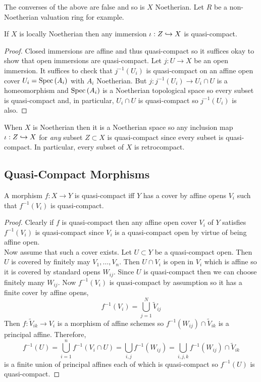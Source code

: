 \documentclass[12pt]{article}
\begin{document}
\begin{rmk}
The converses of the above are false and so is $X$ Noetherian. Let $R$ be a non-Noetherian valuation ring for example.
\end{rmk}

\begin{lemma}
If $X$ is locally Noetherian then any immersion $\iota : Z \hookrightarrow X$ is quasi-compact.
\end{lemma}

\begin{proof}
Closed immersions are affine and thus quasi-compact so it suffices okay to show that open immersions are quasi-compact. Let $j : U \to X$ be an open immersion. It suffices to check that $j^{-1}(U_i)$ is quasi-compact on an affine open cover $U_i = \mathrm{Spec}\left( A_i \right)$ with $A_i$ Noetherian. But $j : j^{-1}(U_i) \to U_i \cap U$ is a homeomorphism and $\mathrm{Spec}\left( A_i \right)$ is a Noetherian topological space so every subset is quasi-compact and, in particular, $U_i \cap U$ is quasi-compact so $j^{-1}(U_i)$ is also.
\end{proof}

\begin{rmk}
When $X$ is Noetherian then it is a Noetherian space so any inclusion map $\iota : Z \hookrightarrow X$ for \textit{any} subset $Z \subset X$ is quasi-compact since every subset is quasi-compact. In particular, every subset of $X$ is retrocompact. 
\end{rmk}

\subsection{Quasi-Compact Morphisms}

\begin{lemma}
A morphism $f : X \to Y$ is quasi-compact iff $Y$ has a cover by affine opens $V_i$ such that $f^{-1}(V_i)$ is quasi-compact.
\end{lemma}

\begin{proof}
Clearly if $f$ is quasi-compact then any affine open cover $V_i$ of $Y$ satisfies $f^{-1}(V_i)$ is quasi-compact since $V_i$ is a quasi-compact open by virtue of being affine open.
\bigskip\\
Now assume that such a cover exists. Let $U \subset Y$ be a quasi-compact open. Then $U$ is covered by finitely may $V_1, \dots, V_n$. Then $U \cap V_i$ is open in $V_i$ which is affine so it is covered by standard opens $W_{ij}$. Since $U$ is quasi-compact then we can choose finitely many $W_{ij}$. Now $f^{-1}(V_i)$ is quasi-compact by assumption so it has a finite cover by affine opens,
\[ f^{-1}(V_i) = \bigcup_{j = 1}^N \tilde{V}_{ij} \]
Then $f : \tilde{V}_{ik} \to V_i$ is a morphism of affine schemes so $f^{-1}(W_{ij}) \cap \tilde{V}_{ik}$ is a principal affine. Therefore,
\[ f^{-1}(U) = \bigcup_{i = 1}^n f^{-1}(V_i \cap U) = \bigcup_{i,j} f^{-1}(W_{ij}) = \bigcup_{i,j,k} f^{-1}(W_{ij}) \cap \tilde{V}_{ik} \]
is a finite union of principal affines each of which is quasi-compact so $f^{-1}(U)$ is quasi-compact. 
\end{proof}
\end{document}
